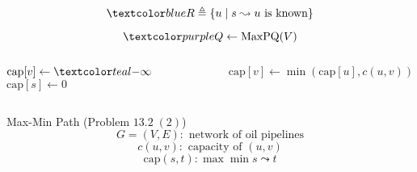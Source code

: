 \begin{frame}{}
  \[
    \blue{R \triangleq \set{u \mid s \leadsto u \text{ is known}}}
  \]

  \[
    \purple{Q \gets \text{MaxPQ}(V)}
  \]

  \vspace{0.50cm}
  \begin{columns}
      \begin{algorithmic}
	  \State $\text{cap}[v] \gets \teal{-\infty}$
	\EndFor
	\State $\text{cap}[s] \gets 0$
      \end{algorithmic}
      \begin{algorithmic}
	  \State $\text{cap}[v] \gets \min(\text{cap}[u], c(u,v))$
	\EndIf
      \end{algorithmic}
  \end{columns}
\end{frame}

\begin{frame}{}
  \begin{exampleblock}{Max-Min Path (Problem $13.2\; (2)$)}
    \[
      G = (V, E): \text{ network of oil pipelines}
    \]
    \[
      c(u,v): \text{ capacity of } (u,v)
    \]
    \[
      \text{cap}(s,t): \max \min s \leadsto t
    \]
      
    \vspace{0.30cm}
    \centerline{}
  \end{exampleblock}

  \pause
  \vspace{0.30cm}
\end{frame}
